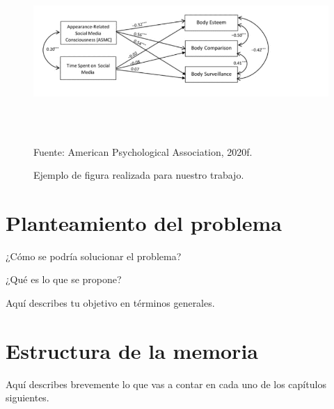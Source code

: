 \begin{figure}[H]
	\begin{center}
		\caption{Ejemplo de figura realizada para nuestro trabajo.}
		\label{fig:1}
		\includegraphics[width=4.90737in,height=2.42708in]{figura}

		\small Fuente: American Psychological Association, 2020f.
	\end{center}
\end{figure}

\section{Planteamiento del problema}

¿Cómo se podría solucionar el problema?

¿Qué es lo que se propone?

Aquí describes tu objetivo en términos generales.

\section{Estructura de la memoria}

Aquí describes brevemente lo que vas a contar en cada uno de los capítulos siguientes.